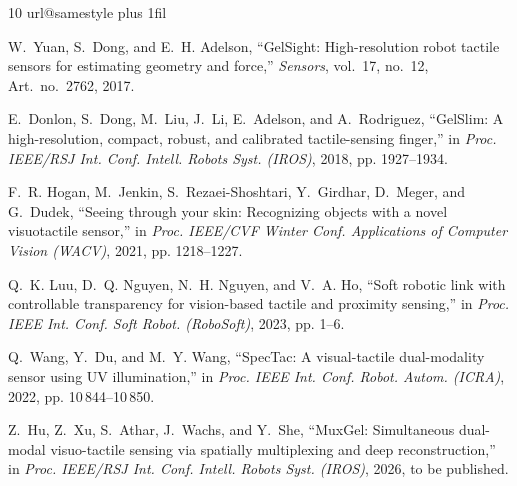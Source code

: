 \documentclass[letterpaper,10pt,conference]{ieeeconf}
\begin{document}
\begin{thebibliography}{10}
\providecommand{\url}[1]{#1}
\csname url@samestyle\endcsname
\providecommand{\newblock}{\relax}
\providecommand{\bibinfo}[2]{#2}
\providecommand{\BIBentrySTDinterwordspacing}{\spaceskip=0pt\relax}
\providecommand{\BIBentryALTinterwordstretchfactor}{4}
\providecommand{\BIBentryALTinterwordspacing}{\spaceskip=\fontdimen2\font plus
\BIBentryALTinterwordstretchfactor\fontdimen3\font minus
  \fontdimen4\font\relax}
\providecommand{\BIBforeignlanguage}[2]{{%
\expandafter\ifx\csname l@#1\endcsname\relax
\typeout{** WARNING: IEEEtran.bst: No hyphenation pattern has been}%
\typeout{** loaded for the language `#1'. Using the pattern for}%
\typeout{** the default language instead.}%
\else
\language=\csname l@#1\endcsname
\fi
#2}}
\providecommand{\BIBdecl}{\relax}
\BIBdecl
\rightskip=0pt plus 1fil\relax

W.~Yuan, S.~Dong, and E.~H. Adelson, ``{GelSight}: High-resolution robot
tactile sensors for estimating geometry and force,'' \emph{Sensors}, vol.~17,
no.~12, Art.~no.~2762, 2017.

E.~Donlon, S.~Dong, M.~Liu, J.~Li, E.~Adelson, and A.~Rodriguez, ``{GelSlim}: A
  high-resolution, compact, robust, and calibrated tactile-sensing finger,'' in
 \emph{Proc. IEEE/RSJ Int. Conf. Intell. Robots Syst. (IROS)}, 2018,
  pp. 1927--1934.

F.~R. Hogan, M.~Jenkin, S.~Rezaei-Shoshtari, Y.~Girdhar, D.~Meger, and
  G.~Dudek, ``Seeing through your skin: Recognizing objects with a novel
  visuotactile sensor,'' in \emph{Proc. IEEE/CVF Winter Conf. Applications of
  Computer} \emph{Vision (WACV)}, 2021, pp. 1218--1227.

Q.~K. Luu, D.~Q. Nguyen, N.~H. Nguyen, and V.~A. Ho, ``Soft robotic link with
controllable transparency for vision-based tactile and proximity sensing,''
in \emph{Proc. IEEE Int. Conf. Soft Robot. (RoboSoft)}, 2023, pp. 1--6.

Q.~Wang, Y.~Du, and M.~Y. Wang, ``{SpecTac}: A visual-tactile dual-modality
  sensor using {UV} illumination,'' in \emph{Proc. IEEE Int. Conf. Robot. Autom. (ICRA)}, 2022, pp. 10\,844--10\,850.

Z.~Hu, Z.~Xu, S.~Athar, J.~Wachs, and Y.~She, ``{MuxGel}: Simultaneous
  dual-modal visuo-tactile sensing via spatially multiplexing and deep
  reconstruction,'' in \emph{Proc. IEEE/RSJ Int. Conf. Intell. Robots
  Syst. (IROS)}, 2026, to be published.


\end{thebibliography}
\end{document}
